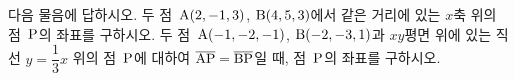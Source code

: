 다음 물음에 답하시오.
 두 점~$\mathrm{A}(2{,}\mkern3mu\mathopen{}-1{,}\mkern3mu\mathopen{}3)$, $\mathrm{B}(4{,}\mkern3mu\mathopen{}5{,}\mkern3mu\mathopen{}3)$에서 같은 거리에 있는 $x$축 위의 점~$\mathrm{P}$의 좌표를 구하시오.
 두 점~$\mathrm{A}(-1{,}\mkern3mu\mathopen{}-2{,}\mkern3mu\mathopen{}-1)$, $\mathrm{B}(-2{,}\mkern3mu\mathopen{}-3{,}\mkern3mu\mathopen{}1)$과 $xy$평면 위에 있는 직선 $y=\dfrac{1}{3}x$ 위의 점~$\mathrm{P}$에 대하여 $\overline{\mathrm{AP}}=\overline{\mathrm{BP}}$일 때, 점~$\mathrm{P}$의 좌표를 구하시오.
